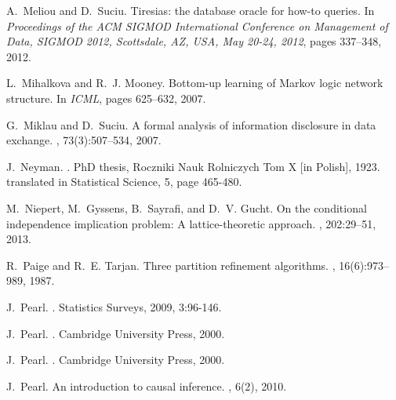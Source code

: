 \begin{thebibliography}{10}

A.~Meliou and D.~Suciu.
\newblock Tiresias: the database oracle for how-to queries.
\newblock In {\em Proceedings of the {ACM} {SIGMOD} International Conference on
  Management of Data, {SIGMOD} 2012, Scottsdale, AZ, USA, May 20-24, 2012},
  pages 337--348, 2012.

L.~Mihalkova and R.~J. Mooney.
\newblock Bottom-up learning of {M}arkov logic network structure.
\newblock In {\em ICML}, pages 625--632, 2007.




G.~Miklau and D.~Suciu.
\newblock A formal analysis of information disclosure in data exchange.
, 73(3):507--534, 2007.

J.~Neyman.
.
\newblock PhD thesis, Roczniki Nauk Rolniczych Tom X [in Polish], 1923.
\newblock translated in Statistical Science, 5, page 465-480.

M.~Niepert, M.~Gyssens, B.~Sayrafi, and D.~V. Gucht.
\newblock On the conditional independence implication problem: {A}
  lattice-theoretic approach.
, 202:29--51, 2013.

R.~Paige and R.~E. Tarjan.
\newblock Three partition refinement algorithms.
, 16(6):973--989, 1987.

J.~Pearl.
.
\newblock  Statistics Surveys, 2009, 3:96-146.

J.~Pearl.
.
\newblock Cambridge University Press, 2000.

J.~Pearl.
.
\newblock Cambridge University Press, 2000.


J.~Pearl.
\newblock An introduction to causal inference.
, 6(2), 2010.


\end{thebibliography}
